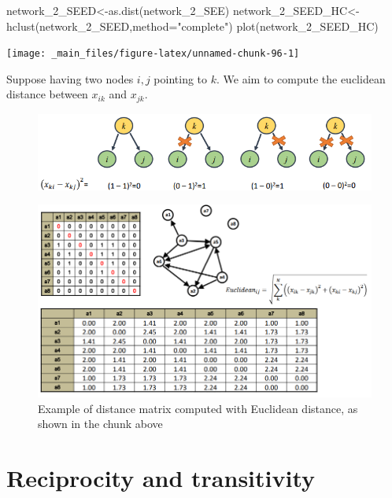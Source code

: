 \documentclass[
  notitlepage,
  onecolumn,
  openany]{book}
\newenvironment{Shaded}{\begin{snugshade}}{\end{snugshade}}
\newcommand{\AttributeTok}[1]{\textcolor[rgb]{0.77,0.63,0.00}{#1}}
\newcommand{\FunctionTok}[1]{\textcolor[rgb]{0.00,0.00,0.00}{#1}}
\newcommand{\NormalTok}[1]{#1}
\newcommand{\OtherTok}[1]{\textcolor[rgb]{0.56,0.35,0.01}{#1}}
\newcommand{\StringTok}[1]{\textcolor[rgb]{0.31,0.60,0.02}{#1}}
\begin{document}
\begin{Shaded}
\begin{Highlighting}[]
\NormalTok{network\_2\_SEED}\OtherTok{\textless{}{-}}\FunctionTok{as.dist}\NormalTok{(network\_2\_SEE)}
\NormalTok{network\_2\_SEED\_HC}\OtherTok{\textless{}{-}}\FunctionTok{hclust}\NormalTok{(network\_2\_SEED,}\AttributeTok{method=}\StringTok{"complete"}\NormalTok{)}
\FunctionTok{plot}\NormalTok{(network\_2\_SEED\_HC)}
\end{Highlighting}
\end{Shaded}

\texttt{[image: \_main\_files/figure-latex/unnamed-chunk-96-1]}

Suppose having two nodes \(i,j\) pointing to \(k\). We aim to compute the euclidean distance between \(x_{ik}\) and \(x_{jk}\).

\begin{figure}[h!]

{\centering \includegraphics[width=0.7\linewidth]{images/11-Subgroups and Structural Equivalence/Untitled 9} 

}

\end{figure}

\begin{figure}[h!]

{\centering \includegraphics[width=0.7\linewidth]{images/11-Subgroups and Structural Equivalence/Untitled 10} 

}

\caption{Example of distance matrix computed with Euclidean distance, as shown in the chunk above}\label{fig:unnamed-chunk-98}
\end{figure}

\hypertarget{reciprocity-and-transitivity}{%
\chapter{Reciprocity and transitivity}\label{reciprocity-and-transitivity}}
\end{document}

